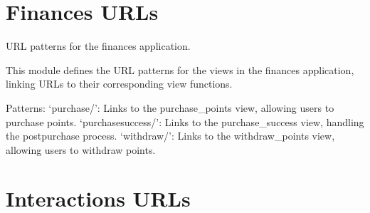 \documentclass[letterpaper,10pt,english]{sphinxmanual}
\begin{document}
\section{Finances URLs}
\label{\detokenize{modules/urls:module-finances.urls}}\label{\detokenize{modules/urls:finances-urls}}

\begin{fulllineitems}
\label{\detokenize{modules/urls:finances.urls.urlpatterns}}
\pysigstartsignatures
{}
\pysigstopsignatures
\sphinxAtStartPar
URL patterns for the finances application.

\sphinxAtStartPar
This module defines the URL patterns for the views in the finances application,
linking URLs to their corresponding view functions.

\sphinxAtStartPar
Patterns:
\sphinxhyphen{} ‘purchase/’: Links to the purchase\_points view, allowing users to purchase points.
\sphinxhyphen{} ‘purchase\sphinxhyphen{}success/’: Links to the purchase\_success view, handling the post\sphinxhyphen{}purchase process.
\sphinxhyphen{} ‘withdraw/’: Links to the withdraw\_points view, allowing users to withdraw points.

\end{fulllineitems}



\section{Interactions URLs}
\label{\detokenize{modules/urls:module-interactions.urls}}\label{\detokenize{modules/urls:interactions-urls}}
\end{document}
